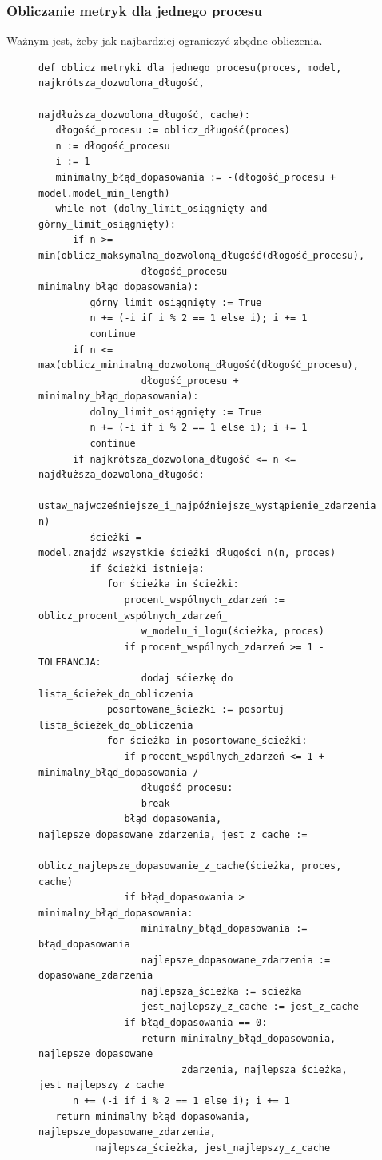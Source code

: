 \subsubsection{Obliczanie metryk dla jednego procesu}
Ważnym jest, żeby jak najbardziej ograniczyć zbędne obliczenia.  
\begin{figure}[!ht]
\lstset{caption=Obliczanie metryk dla jednego procesu, captionpos=b}
\lstset{label=src:best_result, frame=single}
\begin{lstlisting}
def oblicz_metryki_dla_jednego_procesu(proces, model, najkrótsza_dozwolona_długość, 
				               najdłuższa_dozwolona_długość, cache):
   dłogość_procesu := oblicz_długość(proces)
   n := dłogość_procesu
   i := 1
   minimalny_błąd_dopasowania := -(dłogość_procesu + model.model_min_length)
   while not (dolny_limit_osiągnięty and górny_limit_osiągnięty):
      if n >= min(oblicz_maksymalną_dozwoloną_długość(dłogość_procesu), 
                  dłogość_procesu - minimalny_błąd_dopasowania):
         górny_limit_osiągnięty := True
         n += (-i if i % 2 == 1 else i); i += 1
         continue
      if n <= max(oblicz_minimalną_dozwoloną_długość(dłogość_procesu), 
                  dłogość_procesu + minimalny_błąd_dopasowania):
         dolny_limit_osiągnięty := True
         n += (-i if i % 2 == 1 else i); i += 1
         continue
      if najkrótsza_dozwolona_długość <= n <= najdłuższa_dozwolona_długość:
         ustaw_najwcześniejsze_i_najpóźniejsze_wystąpienie_zdarzenia(model, n)
         ścieżki = model.znajdź_wszystkie_ścieżki_długości_n(n, proces)
         if ścieżki istnieją:
            for ścieżka in ścieżki:
               procent_wspólnych_zdarzeń := oblicz_procent_wspólnych_zdarzeń_
                  w_modelu_i_logu(ścieżka, proces)
               if procent_wspólnych_zdarzeń >= 1 - TOLERANCJA:
                  dodaj sćiezkę do lista_ścieżek_do_obliczenia
            posortowane_ścieżki := posortuj lista_ścieżek_do_obliczenia
            for ścieżka in posortowane_ścieżki:
               if procent_wspólnych_zdarzeń <= 1 + minimalny_błąd_dopasowania /
                  długość_procesu:
                  break
               błąd_dopasowania, najlepsze_dopasowane_zdarzenia, jest_z_cache :=
                  oblicz_najlepsze_dopasowanie_z_cache(ścieżka, proces, cache)
               if błąd_dopasowania > minimalny_błąd_dopasowania:
                  minimalny_błąd_dopasowania := błąd_dopasowania
                  najlepsze_dopasowane_zdarzenia := dopasowane_zdarzenia
                  najlepsza_ścieżka := scieżka
                  jest_najlepszy_z_cache := jest_z_cache
               if błąd_dopasowania == 0:
                  return minimalny_błąd_dopasowania, najlepsze_dopasowane_
                         zdarzenia, najlepsza_ścieżka, jest_najlepszy_z_cache
      n += (-i if i % 2 == 1 else i); i += 1
   return minimalny_błąd_dopasowania, najlepsze_dopasowane_zdarzenia, 
          najlepsza_ścieżka, jest_najlepszy_z_cache
\end{lstlisting}
\end{figure}

